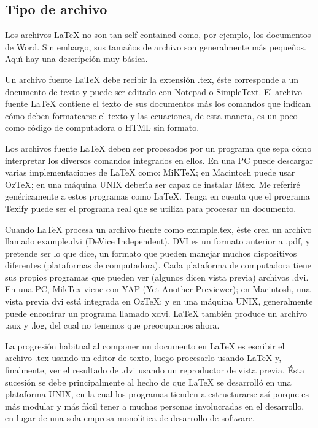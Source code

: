 \documentclass[letterpaper, 10pt, journal]{IEEEtran}
\begin{document}
\subsection{Tipo de archivo}
Los archivos \LaTeX{} no son tan self-contained como, por ejemplo, los documentos de Word. Sin embargo, sus tama\~{n}os de archivo son generalmente m\'{a}s peque\~{n}os. Aqu\'{\i} hay una descripci\'{o}n muy b\'{a}sica.

Un archivo fuente \LaTeX{} debe recibir la extensi\'{o}n .tex, \'este corresponde a un documento de texto y puede ser editado con Notepad o SimpleText. El archivo fuente \LaTeX{} contiene el texto de sus documentos m\'{a}s los comandos que indican c\'{o}mo deben formatearse el texto y las ecuaciones, de esta manera, es un poco como c\'{o}digo de computadora o HTML sin formato.

Los archivos fuente \LaTeX{} deben ser procesados por un programa que sepa c\'{o}mo interpretar los diversos comandos integrados en ellos. En una PC puede descargar varias implementaciones de \LaTeX{} como: MiKTeX; en Macintosh puede usar OzTeX; en una m\'{a}quina UNIX deber\'{\i}a ser capaz de instalar l\'{a}tex. Me referir\'{e} gen\'{e}ricamente a estos programas como \LaTeX{}. Tenga en cuenta que el programa Texify puede ser el programa real que se utiliza para procesar un documento.

Cuando \LaTeX{} procesa un archivo fuente como example.tex, \'este crea un archivo llamado example.dvi (DeVice Independent). DVI es un formato anterior a .pdf, y pretende ser lo que dice, un formato que pueden manejar muchos dispositivos diferentes (plataformas de computadora). Cada plataforma de computadora tiene sus propios programas que pueden ver (algunos dicen vista previa) archivos .dvi. En una PC, MikTex viene con YAP (Yet Another Previewer); en Macintosh, una vista previa dvi est\'{a} integrada en OzTeX; y en una m\'{a}quina UNIX, generalmente puede encontrar un programa llamado xdvi. \LaTeX{} tambi\'{e}n produce un archivo .aux y .log, del cual no tenemos que preocuparnos ahora.

La progresi\'on habitual al componer un documento en \LaTeX{} es escribir el archivo .tex usando un editor de texto, luego procesarlo usando \LaTeX{} y, finalmente, ver el resultado de .dvi usando un reproductor de vista previa. \'Esta sucesi\'on se debe principalmente al hecho de que \LaTeX{} se desarroll\'o en una plataforma UNIX, en la cual los programas tienden a estructurarse as\'i porque es m\'as modular y m\'as f\'acil tener a muchas personas involucradas en el desarrollo, en lugar de una sola empresa monol\'itica de desarrollo de software. 
\end{document}

